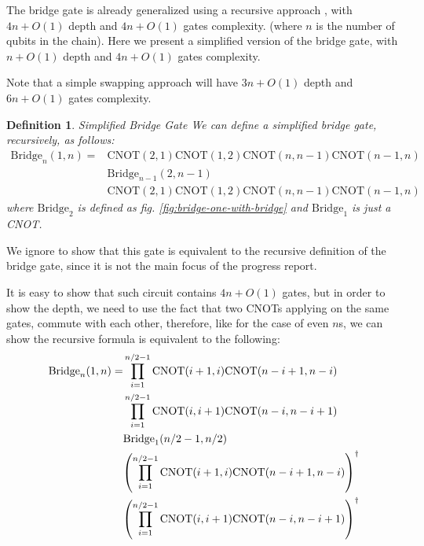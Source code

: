 \documentclass{article}
\newtheorem{defn}{Definition}
\begin{document}
  The bridge gate is already generalized using a recursive approach \cite{shende2006}, with $4n + O(1)$ depth and $4n + O(1)$ gates complexity. (where $n$ is the number of qubits in the chain). Here we present a simplified version of the bridge gate, with $n + O(1)$ depth and $4n + O(1)$ gates complexity.

  Note that a simple swapping approach will have $3n + O(1)$ depth and $6n + O(1)$ gates complexity.

  \begin{defn}{Simplified Bridge Gate}
    We can define a simplified bridge gate, recursively, as follows:
    \begin{equation}
      \begin{aligned}
      \mathrm{Bridge}_n(1, n) =& \mathrm{CNOT}(2, 1) \mathrm{CNOT}(1, 2)
      \mathrm{CNOT}(n, n - 1) \mathrm{CNOT}(n - 1, n) \\ &\mathrm{Bridge}_{n - 1}(2, n - 1) \\ &\mathrm{CNOT}(2, 1) \mathrm{CNOT}(1, 2)
      \mathrm{CNOT}(n, n - 1) \mathrm{CNOT}(n - 1, n)
      \end{aligned}
    \end{equation}
    where $\mathrm{Bridge}_2$ is defined as fig. \ref{fig:bridge-one-with-bridge} and $\mathrm{Bridge}_1$ is just a CNOT.
  \end{defn}

  We ignore to show that this gate is equivalent to the recursive definition of the bridge gate, since it is not the main focus of the progress report.

  It is easy to show that such circuit contains $4n + O(1)$ gates, but in order to show the depth, we need to use the fact that two CNOTs applying on the same gates, commute with each other, therefore, like for the case of even $n$s, we can show the recursive formula is equivalent to the following:
    \begin{equation}
      \begin{aligned}
      \mathrm{Bridge}_n(1, n) = &\prod_{i=1}^{n/2 - 1}\mathrm{CNOT}(i + 1, i)\mathrm{CNOT}(n - i + 1, n - i) \\ & \prod_{i=1}^{n/2 - 1}\mathrm{CNOT}(i, i + 1)\mathrm{CNOT}(n - i, n - i + 1) \\ & \mathrm{Bridge}_1(n/2 - 1, n/2)  \\
    & \qty(\prod_{i=1}^{n/2 - 1}\mathrm{CNOT}(i + 1, i)\mathrm{CNOT}(n - i + 1, n - i))^\dagger \\ 
    & \qty(\prod_{i=1}^{n/2 - 1}\mathrm{CNOT}(i, i + 1)\mathrm{CNOT}(n - i, n - i + 1))^\dagger
      \end{aligned}
    \end{equation}
\end{document}
